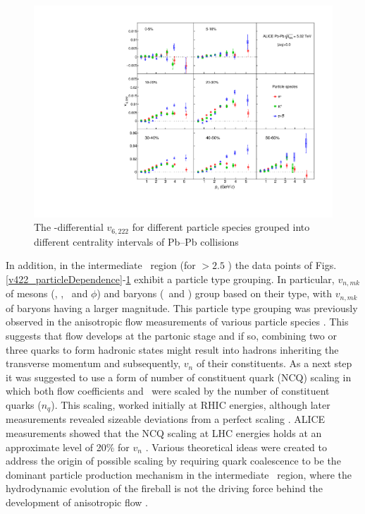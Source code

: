 \begin{figure}[!htb]
\begin{center}
\includegraphics[scale=0.82]{figures/results/All_v6222_gap00_PID2_3by3.pdf}

\end{center}
\caption{The \pT-differential $v_{6,222}$ for different particle species grouped into different centrality intervals of Pb--Pb collisions \sNN}
\label{v6222_particleDependence}
\end{figure}

\newpage

In addition, in the intermediate \pT~region (for \pT $> 2.5$ \GeV) the data points of Figs. \ref{v422_particleDependence}-\ref{v6222_particleDependence} exhibit a particle type grouping. In particular, $v_{n,mk}$ of mesons (\pion, \kaon, \Ks~and $\phi$) and baryons (\proton~and \lambdas) group based on their type, with $v_{n,mk}$ of baryons having a larger magnitude. This particle type grouping was previously observed in the anisotropic flow measurements of various particle species \cite{Abelev:2014pua,Adam:2016nfo,Acharya:2018zuq,Adams:2003am,Abelev:2007qg,Adler:2003kt,Adare:2006ti}. This suggests that flow develops at the partonic stage and if so, combining two or three quarks to form hadronic states might result into hadrons inheriting the transverse momentum and subsequently, $v_{n}$ of their constituents. As a next step it was suggested to use a form of number of constituent quark (NCQ) scaling in which both flow coefficients and \pT~were scaled by the number of constituent quarks ($n_{q}$). This scaling, worked initially at RHIC energies, although later measurements revealed sizeable deviations from a perfect scaling \cite{Adams:2003am,Abelev:2007qg,Adler:2003kt,Adare:2006ti}. ALICE measurements showed that the NCQ scaling at LHC energies holds at an approximate level of 20\% for $v_{n}$ \cite{Abelev:2014pua,Adam:2016nfo,Acharya:2018zuq}. Various theoretical ideas were created to address the origin of possible scaling by requiring quark coalescence to be the dominant particle production mechanism in the intermediate \pT~region, where the hydrodynamic evolution of the fireball is not the driving force behind the development of anisotropic flow \cite{Voloshin:2002wa,Molnar:2003ff}.

